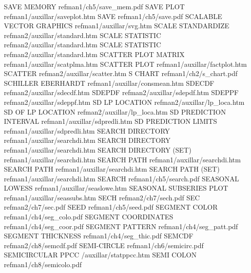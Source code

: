 SAVE MEMORY                             refman1/ch5/save_mem.pdf
SAVE PLOT                               refman1/auxillar/saveplot.htm
SAVE                                    refman1/ch5/save.pdf
SCALABLE VECTOR GRAPHICS                refman1/auxillar/svg.htm
SCALE STANDARDIZE                       refman2/auxillar/standard.htm
SCALE STATISTIC                         refman2/auxillar/standard.htm
SCALE STATISTIC                         refman2/auxillar/standard.htm
SCATTER PLOT MATRIX                     refman1/auxillar/scatplma.htm
SCATTER PLOT                            refman1/auxillar/factplot.htm
SCATTER                                 refman2/auxillar/scatter.htm
S CHART                                 refman1/ch2/s_chart.pdf
SCHILLER EBERHARDT                      refman1/auxillar/consmean.htm
SDECDF                                  refman2/auxillar/sdecdf.htm
SDEPDF                                  refman2/auxillar/sdepdf.htm
SDEPPF                                  refman2/auxillar/sdeppf.htm
SD LP LOCATION                          refman2/auxillar/lp_loca.htm
SD OF LP LOCATION                       refman2/auxillar/lp_loca.htm
SD PREDICTION INTERVAL                  refman1/auxillar/sdpredli.htm
SD PREDICTION LIMITS                    refman1/auxillar/sdpredli.htm
SEARCH DIRECTORY                        refman1/auxillar/searchdi.htm
SEARCH DIRECTORY                        refman1/auxillar/searchdi.htm
SEARCH DIRECTORY (SET)                  refman1/auxillar/searchdi.htm
SEARCH PATH                             refman1/auxillar/searchdi.htm
SEARCH PATH                             refman1/auxillar/searchdi.htm
SEARCH PATH (SET)                       refman1/auxillar/searchdi.htm
SEARCH                                  refman1/ch5/search.pdf
SEASONAL LOWESS                         refman1/auxillar/seaslowe.htm
SEASONAL SUBSERIES PLOT                 refman1/auxillar/seassubs.htm
SECH                                    refman2/ch7/sech.pdf
SEC                                     refman2/ch7/sec.pdf
SEED                                    refman1/ch5/seed.pdf
SEGMENT COLOR                           refman1/ch4/seg_colo.pdf
SEGMENT COORDINATES                     refman1/ch4/seg_coor.pdf
SEGMENT PATTERN                         refman1/ch4/seg_patt.pdf
SEGMENT THICKNESS                       refman1/ch4/seg_thic.pdf
SEMCDF                                  refman2/ch8/semcdf.pdf
SEMI-CIRCLE                             refman1/ch6/semicirc.pdf
SEMICIRCULAR PPCC                       /auxillar/statppcc.htm
SEMI COLON                              refman1/ch8/semicolo.pdf
